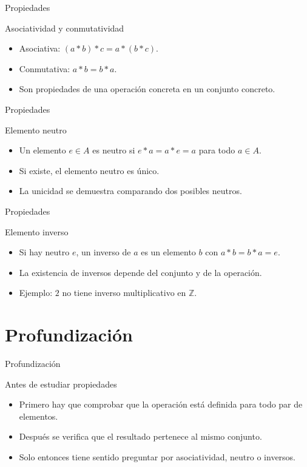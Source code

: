 \documentclass[aspectratio=169,11pt]{beamer}
\begin{document}
\begin{frame}{Propiedades}
\begin{block}{Asociatividad y conmutatividad}
\begin{itemize}
  \item Asociativa: \((a*b)*c=a*(b*c)\).
  \item Conmutativa: \(a*b=b*a\).
  \item Son propiedades de una operación concreta en un conjunto concreto.
\end{itemize}
\end{block}
\end{frame}

\begin{frame}{Propiedades}
\begin{block}{Elemento neutro}
\begin{itemize}
  \item Un elemento \(e\in A\) es neutro si \(e*a=a*e=a\) para todo \(a\in A\).
  \item Si existe, el elemento neutro es único.
  \item La unicidad se demuestra comparando dos posibles neutros.
\end{itemize}
\end{block}
\end{frame}

\begin{frame}{Propiedades}
\begin{block}{Elemento inverso}
\begin{itemize}
  \item Si hay neutro \(e\), un inverso de \(a\) es un elemento \(b\) con \(a*b=b*a=e\).
  \item La existencia de inversos depende del conjunto y de la operación.
  \item Ejemplo: \(2\) no tiene inverso multiplicativo en \(\mathbb{Z}\).
\end{itemize}
\end{block}
\end{frame}

\section{Profundización}

\begin{frame}{Profundización}
\begin{block}{Antes de estudiar propiedades}
\begin{itemize}
  \item Primero hay que comprobar que la operación está definida para todo par de elementos.
  \item Después se verifica que el resultado pertenece al mismo conjunto.
  \item Solo entonces tiene sentido preguntar por asociatividad, neutro o inversos.
\end{itemize}
\end{block}
\end{frame}
\end{document}
